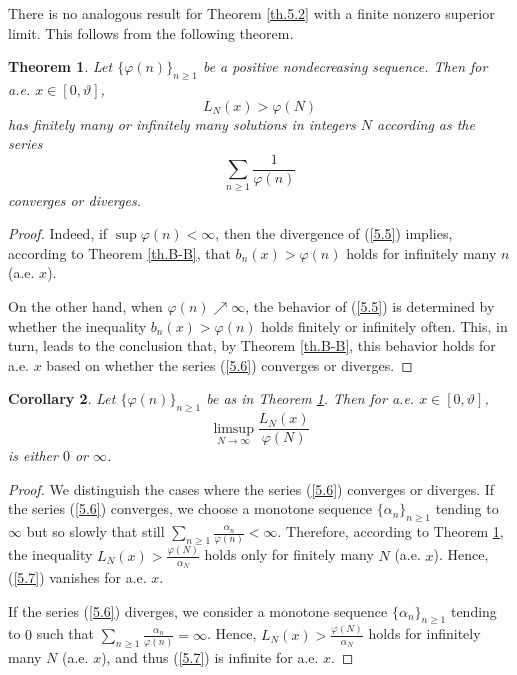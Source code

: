 \documentclass[final,1p,times]{elsarticle}
\newtheorem{theorem}{Theorem}[section]
\newtheorem{corollary}[theorem]{Corollary}
\numberwithin{equation}{section}
\begin{document}
There is no analogous result for Theorem \ref{th.5.2} with a finite nonzero superior limit. This follows from the following theorem.

\begin{theorem} \label{th.5.3}
Let $\{\varphi(n)\}_{n \geq 1}$ be a positive nondecreasing sequence. Then for a.e. $x \in [0, \vartheta]$, 
\begin{equation} \label{5.5}
L_N(x) > \varphi (N)
\end{equation}
has finitely many or infinitely many solutions in integers $N$ according as the series  
\begin{equation} \label{5.6}
\sum_{n \geq 1} \frac{1}{\varphi(n)}
\end{equation}
converges or diverges.
\end{theorem}

\begin{proof}
Indeed, if $\sup \varphi(n) < \infty$, then the divergence of (\ref{5.5}) implies, according to Theorem \ref{th.B-B}, that $b_n(x) > \varphi(n)$ holds for infinitely many $n$ (a.e. $x$).

On the other hand, when $\varphi(n) \nearrow \infty$, the behavior of (\ref{5.5}) is determined by whether the inequality $b_n(x) > \varphi(n)$ holds finitely or infinitely often. This, in turn, leads to the conclusion that, by Theorem \ref{th.B-B}, this behavior holds for a.e. $x$ based on whether the series (\ref{5.6}) converges or diverges.
\end{proof}

\begin{corollary} \label{cor.5.4}
Let $\{\varphi(n)\}_{n \geq 1}$ be as in Theorem \ref{th.5.3}. Then for a.e. $x \in [0, \vartheta]$,
\begin{equation} \label{5.7}
\limsup_{N \to \infty} \frac{L_N(x)}{\varphi(N)}
\end{equation}
is either $0$ or $\infty$.
\end{corollary}

\begin{proof}
We distinguish the cases where the series (\ref{5.6}) converges or diverges. If the series (\ref{5.6}) converges, we choose a monotone sequence $\{\alpha_n\}_{n \geq 1}$ tending to $\infty$ but so slowly that still $\sum_{n \geq 1} \frac{\alpha_n}{\varphi(n)} < \infty$. Therefore, according to Theorem \ref{th.5.3}, the inequality $L_N(x) > \frac{\varphi(N)}{\alpha_N}$ holds only for finitely many $N$ (a.e. $x$). Hence, (\ref{5.7}) vanishes for a.e. $x$. 

If the series (\ref{5.6}) diverges, we consider a monotone sequence $\{\alpha_n\}_{n \geq 1}$ tending to $0$ such that $\sum_{n \geq 1} \frac{\alpha_n}{\varphi(n)} = \infty$. Hence, $L_N(x) > \frac{\varphi(N)}{\alpha_N}$ holds for infinitely many $N$ (a.e. $x$), and thus (\ref{5.7}) is infinite for a.e. $x$.
\end{proof}
\end{document}
